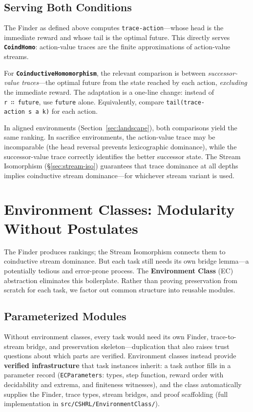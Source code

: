 \documentclass[runningheads]{llncs}
\newcommand{\fpath}[1]{\nolinkurl{#1}}
\begin{document}
\subsection{Serving Both Conditions}

The Finder as defined above computes \texttt{trace-action}---whose head is the immediate reward and whose tail is the optimal future.  This directly serves \textbf{\texttt{CoindHomo}}: action-value traces are the finite approximations of action-value streams.

For \textbf{\texttt{CoinductiveHomomorphism}}, the relevant comparison is between \emph{successor-value traces}---the optimal future from the state reached by each action, \emph{excluding} the immediate reward.  The adaptation is a one-line change: instead of \texttt{r~∷~future}, use \texttt{future} alone.  Equivalently, compare \texttt{tail(trace-action~s~a~k)} for each action.

In aligned environments (Section~\ref{sec:landscape}), both comparisons yield the same ranking.  In sacrifice environments, the action-value trace may be incomparable (the head reversal prevents lexicographic dominance), while the successor-value trace correctly identifies the better successor state.  The Stream Isomorphism (\S\ref{sec:stream-iso}) guarantees that trace dominance at all depths implies coinductive stream dominance---for whichever stream variant is used.

\section{Environment Classes: Modularity Without Postulates}\label{sec:env-classes}

The Finder produces rankings; the Stream Isomorphism connects them to coinductive stream dominance.  But each task still needs its own bridge lemma---a potentially tedious and error-prone process.  The \textbf{Environment Class} (EC) abstraction eliminates this boilerplate.  Rather than proving preservation from scratch for each task, we factor out common structure into reusable modules.

\subsection{Parameterized Modules}

Without environment classes, every task would need its own Finder, trace-to-stream bridge, and preservation skeleton---duplication that also raises trust questions about which parts are verified.  Environment classes instead provide \textbf{verified infrastructure} that task instances inherit: a task author fills in a parameter record (\texttt{ECParameters}: types, step function, reward order with decidability and extrema, and finiteness witnesses), and the class automatically supplies the Finder, trace types, stream bridges, and proof scaffolding (full implementation in \fpath{src/CSHRL/EnvironmentClass/}).
\end{document}
